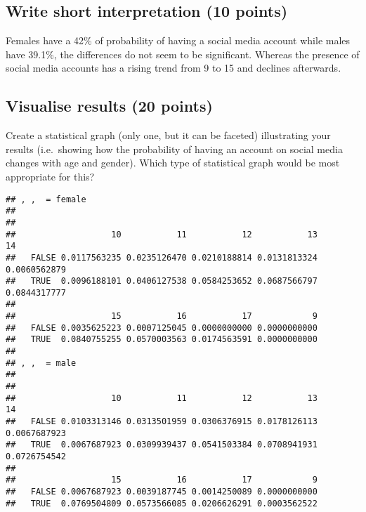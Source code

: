 \documentclass[
]{article}
\newenvironment{Shaded}{\begin{snugshade}}{\end{snugshade}}
\newcommand{\DecValTok}[1]{\textcolor[rgb]{0.00,0.00,0.81}{#1}}
\newcommand{\KeywordTok}[1]{\textcolor[rgb]{0.13,0.29,0.53}{\textbf{#1}}}
\newcommand{\NormalTok}[1]{#1}
\newcommand{\OperatorTok}[1]{\textcolor[rgb]{0.81,0.36,0.00}{\textbf{#1}}}
\newcommand{\StringTok}[1]{\textcolor[rgb]{0.31,0.60,0.02}{#1}}
\begin{document}
\hypertarget{write-short-interpretation-10-points}{%
\subsection{Write short interpretation (10
points)}\label{write-short-interpretation-10-points}}

Females have a 42\% of probability of having a social media account
while males have 39.1\%, the differences do not seem to be significant.
Whereas the presence of social media accounts has a rising trend from 9
to 15 and declines afterwards.

\hypertarget{visualise-results-20-points}{%
\subsection{Visualise results (20
points)}\label{visualise-results-20-points}}

Create a statistical graph (only one, but it can be faceted)
illustrating your results (i.e.~showing how the probability of having an
account on social media changes with age and gender). Which type of
statistical graph would be most appropriate for this?

\begin{Shaded}
\end{Shaded}

\begin{verbatim}
## , ,  = female
## 
##        
##                   10           11           12           13           14
##   FALSE 0.0117563235 0.0235126470 0.0210188814 0.0131813324 0.0060562879
##   TRUE  0.0096188101 0.0406127538 0.0584253652 0.0687566797 0.0844317777
##        
##                   15           16           17            9
##   FALSE 0.0035625223 0.0007125045 0.0000000000 0.0000000000
##   TRUE  0.0840755255 0.0570003563 0.0174563591 0.0000000000
## 
## , ,  = male
## 
##        
##                   10           11           12           13           14
##   FALSE 0.0103313146 0.0313501959 0.0306376915 0.0178126113 0.0067687923
##   TRUE  0.0067687923 0.0309939437 0.0541503384 0.0708941931 0.0726754542
##        
##                   15           16           17            9
##   FALSE 0.0067687923 0.0039187745 0.0014250089 0.0000000000
##   TRUE  0.0769504809 0.0573566085 0.0206626291 0.0003562522
\end{verbatim}
\end{document}
